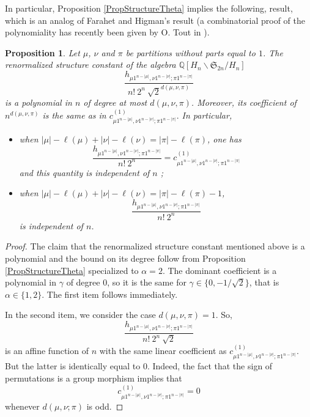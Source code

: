 \documentclass[11pt]{amsart}
\theoremstyle{plain}
\newtheorem{proposition}[lemma]{Proposition}
\theoremstyle{remark}
\newcommand{\Sym}[1]{\mathfrak{S}_{#1}}
\newcommand{\QQ}{\mathbb{Q}}
\begin{document}
In particular, Proposition \ref{PropStructureTheta} implies the following,
result, which is an analog of Farahet and Higman's result \cite{FarahatHigmanCentreQSn}
(a combinatorial proof of the polynomiality
has recently been given by O. Tout in \cite{Tout-Structure-constant-S2n-Hn}).
\begin{proposition}
    Let $\mu$, $\nu$ and $\pi$ be partitions without parts equal to $1$.
    The renormalized structure constant of the algebra $\QQ[H_n \backslash \Sym{2n} / H_n]$
    \[ \frac{h_{\mu 1^{n-|\mu|},\nu 1^{n-|\nu|};\pi 1^{n-|\pi|}}}{n!\ 2^n\ \sqrt{2}^{d(\mu,\nu,\pi)}}\]
    is a polynomial in $n$ of degree at most $d(\mu,\nu,\pi)$.
    Moreover, its coefficient of $n^{d(\mu,\nu,\pi)}$ is the same as in
    $c^{(1)}_{\mu 1^{n-|\mu|},\nu 1^{n-|\nu|};\pi 1^{n-|\pi|}}.$
    In particular,
    \begin{itemize}
        \item when $|\mu|-\ell(\mu) + |\nu|-\ell(\nu)=|\pi| - \ell(\pi)$, one has
            \[\frac{h_{\mu 1^{n-|\mu|},\nu 1^{n-|\nu|};\pi 1^{n-|\pi|}}}{n!\ 2^n}=
            c^{(1)}_{\mu 1^{n-|\mu|},\nu 1^{n-|\nu|};\pi 1^{n-|\pi|}}\]
            and this quantity is independent of $n$ ;
        \item when $|\mu|-\ell(\mu) + |\nu|-\ell(\nu)=|\pi| - \ell(\pi) - 1$,
            \[\frac{h_{\mu 1^{n-|\mu|},\nu 1^{n-|\nu|};\pi 1^{n-|\pi|}}}{n!\ 2^n}\]
            is independent of $n$.
    \end{itemize}
\end{proposition}
\begin{proof}
    The claim that the renormalized structure constant mentioned above is a polynomial and
    the bound on its degree follow from 
    Proposition \ref{PropStructureTheta} specialized to $\alpha=2$.
    The dominant coefficient is a polynomial in $\gamma$ of degree $0$,
    so it is the same for $\gamma \in \{0, -1/\sqrt{2}\}$, that is 
    $\alpha \in \{1,2\}$.
    The first item follows immediately.

    In the second item, we consider the case $d(\mu,\nu,\pi)= 1$.
    So, 
    \[\frac{h_{\mu 1^{n-|\mu|},\nu 1^{n-|\nu|};\pi 1^{n-|\pi|}}}{n!\ 2^n\ \sqrt{2}}\]
    is an affine function of $n$ with the same linear coefficient as 
    $c^{(1)}_{\mu 1^{n-|\mu|},\nu 1^{n-|\nu|};\pi 1^{n-|\pi|}}$.
    But the latter is identically equal to $0$.
    Indeed, the fact that the sign of permutations is a group morphism implies that
    \[c^{(1)}_{\mu 1^{n-|\mu|},\nu 1^{n-|\nu|};\pi 1^{n-|\pi|}}=0\]
    whenever $d(\mu,\nu;\pi)$ is odd.
\end{proof}
\end{document}

